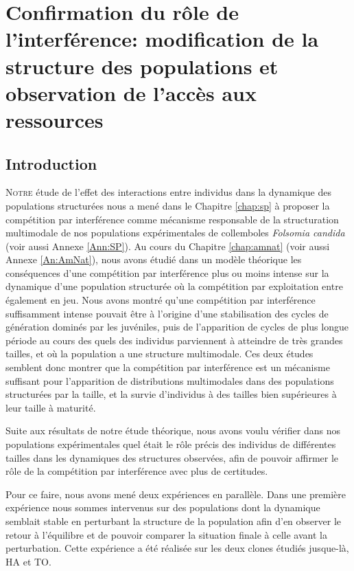 \chapter{Confirmation du rôle de l'interférence: modification de la structure
des populations et observation de l'accès aux ressources}
\label{chap:sm}

\vspace{5cm}

\section{Introduction}

\lettrine[lines=3]{N}{otre} étude de l'effet des interactions entre individus
dans la dynamique des populations structurées nous a mené dans le Chapitre
\ref{chap:sp} à proposer la
compétition par interférence comme mécanisme responsable de la structuration
multimodale de nos populations expérimentales de collemboles \textit{Folsomia
candida} (voir aussi Annexe \ref{Ann:SP}). Au cours du Chapitre
\ref{chap:amnat} (voir aussi Annexe \ref{An:AmNat}), nous avons étudié dans un
modèle théorique les conséquences d'une compétition par interférence plus ou moins intense sur la dynamique d'une population structurée où la compétition par
exploitation entre également en jeu. Nous avons montré qu'une compétition par
interférence suffisamment intense pouvait être à l'origine d'une stabilisation
des cycles de génération dominés par les juvéniles, puis de l'apparition de
cycles de plus longue période au cours des quels des individus parviennent à
atteindre de très grandes tailles, et où la population a une structure
multimodale. Ces deux études semblent donc montrer que la compétition par
interférence est un mécanisme suffisant pour l'apparition de distributions
multimodales dans des populations structurées par la taille, et la survie
d'individus à des tailles bien supérieures à leur taille à maturité.

Suite aux résultats de notre étude théorique, nous avons voulu vérifier dans nos
populations expérimentales quel était le rôle précis des individus de
différentes tailles dans les dynamiques des structures observées, afin de
pouvoir affirmer le rôle de la compétition par interférence avec plus de certitudes.

Pour ce faire, nous avons mené deux expériences en parallèle. Dans une première
expérience nous sommes intervenus sur des populations dont la dynamique semblait
stable en perturbant la structure de la population afin d'en observer le retour
à l'équilibre et de pouvoir comparer la situation finale à celle avant la
perturbation. Cette expérience a été réalisée sur les deux clones étudiés
jusque-là, HA et TO.

